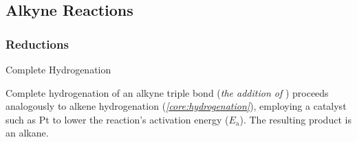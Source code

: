 \documentclass[10pt]{article}
\begin{document}
  \subsection{Alkyne Reactions}

    \subsubsection{Reductions}

      \begin{core}{Complete Hydrogenation}

        Complete hydrogenation of an alkyne triple bond (\textit{the addition of }) proceeds analogously to alkene hydrogenation (\textit{\autoref{core:hydrogenation}}), employing a catalyst such as Pt to lower the reaction's activation energy ($E_\text{a}$). The resulting product is an alkane.


      \end{core}
\end{document}
